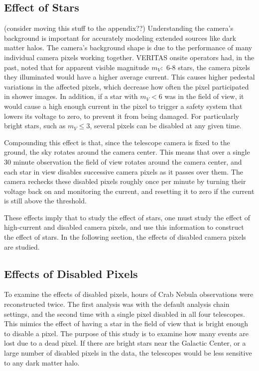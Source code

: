 {  \subsection{Effect of Stars}
    {\color{red}(consider moving this stuff to the appendix??)}
    Understanding the camera's background is important for accurately modeling extended sources like dark matter halos.
    The camera's background shape is due to the performance of many individual camera pixels working together.
    VERITAS onsite operators had, in the past, noted that for apparent visible magnitude $m_V :$ 6-8 stars, the camera pixels they illuminated would have a higher average current.
    This causes higher pedestal variations in the affected pixels, which decrease how often the pixel participated in shower images.
    In addition, if a star with $m_V < 6$ was in the field of view, it would cause a high enough current in the pixel to trigger a safety system that lowers its voltage to zero, to prevent it from being damaged.
    For particularly bright stars, such as $m_V \leq 3$, several pixels can be disabled at any given time.

    Compounding this effect is that, since the telescope camera is fixed to the ground, the sky rotates around the camera center.
    This means that over a single 30 minute observation the field of view rotates around the camera center, and each star in view disables successive camera pixels as it passes over them.
    The camera rechecks these disabled pixels roughly once per minute by turning their voltage back on and monitoring the current, and resetting it to zero if the current is still above the threshold.

    These effects imply that to study the effect of stars, one must study the effect of high-current and disabled camera pixels, and use this information to construct the effect of stars.
    In the following section, the effects of disabled camera pixels are studied.
    
  \subsection{Effects of Disabled Pixels}

    To examine the effects of disabled pixels,  hours of Crab Nebula observations were reconstructed twice.
    The first analysis was with the default analysis chain settings, and the second time with a single pixel disabled in all four telescopes.
    This mimics the effect of having a star in the field of view that is bright enough to disable a pixel.
    The purpose of this study is to examine how many events are lost due to a dead pixel.
    If there are bright stars near the Galactic Center, or a large number of disabled pixels in the data, the telescopes would be less sensitive to any dark matter halo.

}
